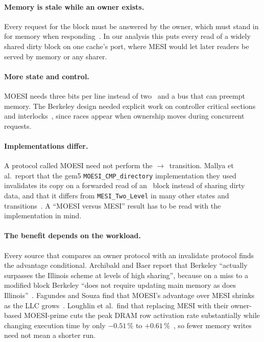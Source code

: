 \paragraph{Memory is stale while an owner exists.} Every request for the block must
be answered by the owner, which must stand in for memory when
responding~\cite[p.~417]{sweazey1986moesi}. In our analysis this puts every read
of a widely shared dirty block on one cache's port, where MESI would let later
readers be served by memory or any sharer.

\paragraph{More state and control.} MOESI needs three bits per line instead of
two~\cite[p.~416]{sweazey1986moesi} and a bus that can preempt memory. The Berkeley
design needed explicit work on controller critical sections and
interlocks~\cite{katz1984implementing}, since races appear when ownership moves
during concurrent requests.

\paragraph{Implementations differ.} A protocol called MOESI need not perform the
\stM$\to$\stO\ transition. Mallya et al.\ report that the gem5
\texttt{MOESI\_CMP\_directory} implementation they used invalidates its copy on a
forwarded read of an \stM\ block instead of sharing dirty data, and that it differs
from \texttt{MESI\_Two\_Level} in many other states and
transitions~\cite{mallya2015simulation}. A ``MOESI versus MESI'' result has to be
read with the implementation in mind.

\paragraph{The benefit depends on the workload.} Every source that compares an
owner protocol with an invalidate protocol finds the advantage conditional.
Archibald and Baer report that Berkeley ``actually surpasses the Illinois scheme
at levels of high sharing'', because on a miss to a modified block Berkeley ``does
not require updating main memory as does
Illinois''~\cite[p.~295]{archibald1986evaluation}. Fagundes and Souza find that
MOESI's advantage over MESI shrinks as the LLC grows~\cite{fagundes2024evaluation}.
Loughlin et al.\ find that replacing MESI with their owner-based MOESI-prime cuts
the peak DRAM row activation rate substantially while changing execution time by
only $-0.51\,\%$ to $+0.61\,\%$~\cite{loughlin2022moesiprime}, so fewer memory
writes need not mean a shorter run.

